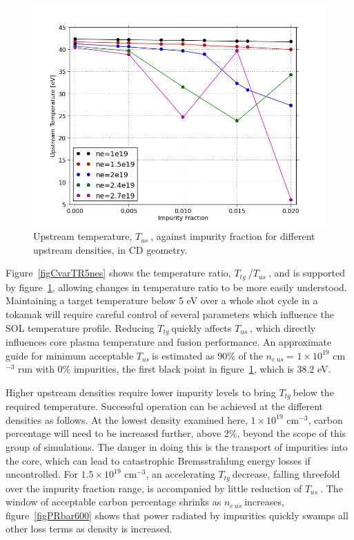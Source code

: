 \documentclass[12pt]{article}  %
\providecommand{\noNe}[1]{{${#1}\times 10^{19}$ cm$^{-3}$}} %
\providecommand{\neus}{$n_{e~us}~$} %
\providecommand{\Tus}{$T_{us}~$} %
\providecommand{\Ttg}{$T_{tg}~$} %
\begin{document}
\begin{figure}
\includegraphics[scale=0.5]{Figures/sol1d/CvarTus.png}
\centering
\caption{Upstream temperature, \Tus, against impurity fraction for different upstream densities, in CD geometry.}\label{figCvarTus}
\end{figure}

Figure~\ref{figCvarTR5nes} shows the temperature ratio, \Ttg/\Tus, and is supported by figure~\ref{figCvarTus}, allowing changes in temperature ratio to be more easily understood. Maintaining a target temperature below 5 eV over a whole shot cycle in a tokamak will require careful control of several parameters which influence the SOL temperature profile. Reducing \Ttg quickly affects \Tus, which directly influences core plasma temperature and fusion performance. An approximate guide for minimum acceptable \Tus is estimated as 90\% of the \neus = \noNe{1} run with 0\% impurities, the first black point in figure~\ref{figCvarTus}, which is 38.2 eV. 

Higher upstream densities require lower impurity levels to bring \Ttg below the required temperature. Successful operation can be achieved at the different densities as follows. At the lowest density examined here, \noNe{1}, carbon percentage will need to be increased further, above 2\%, beyond the scope of this group of simulations. The danger in doing this is the transport of impurities into the core, which can lead to catastrophic Bremsstrahlung energy losses if uncontrolled. For \noNe{1.5}, an accelerating \Ttg decrease, falling threefold over the impurity fraction range, is accompanied by little reduction of \Tus. The window of acceptable carbon percentage shrinks as \neus increases, figure~\ref{figPRbar600} shows that power radiated by impurities quickly swamps all other loss terms as density is increased.
\end{document}
